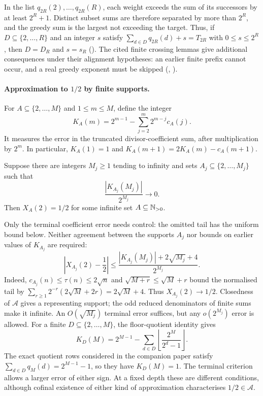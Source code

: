 \documentclass[11pt]{article}
\newcommand{\Ach}{\mathcal A}
\begin{document}
\noindent In the list $q_{2R}(2),\ldots,q_{2R}(R)$, each weight exceeds
the sum of its successors by at least $2^R+1$. Distinct subset sums
are therefore separated by more than $2^R$, and the greedy sum is the
largest not exceeding the target. Thus, if
$D\subseteq\{2,\ldots,R\}$ and an integer $s$ satisfy
$\sum_{d\in D}q_{2R}(d)+s=T_{2R}$ with $0\le s\le2^R$, then
$D=D_R$ and $s=s_R$
().
The cited finite crossing lemmas give additional consequences under their
alignment hypotheses: an earlier finite prefix cannot occur, and a real
greedy exponent must be skipped
(,
).

\paragraph{Approximation to $1/2$ by finite supports.}
For $A\subseteq\{2,\ldots,M\}$ and $1\le m\le M$, define the integer
\[
 K_A(m)=2^{m-1}-\sum_{j=2}^{m}2^{m-j}c_A(j).
\]
It measures the error in the truncated divisor-coefficient sum, after
multiplication by $2^m$.  In particular,
$K_A(1)=1$ and $K_A(m+1)=2K_A(m)-c_A(m+1)$.

\begin{theorem}
\label{res:terminalhalf}
Suppose there are integers $M_j\ge1$ tending to infinity and sets
$A_j\subseteq\{2,\ldots,M_j\}$ such that
\[
 \frac{|K_{A_j}(M_j)|}{2^{M_j}}\longrightarrow0.
\]
Then $X_A(2)=1/2$ for some infinite set $A\subseteq\mathbb{N}_{>0}$.
\end{theorem}

Only the terminal coefficient error needs control: the omitted tail
has the uniform bound below. Neither agreement between the supports
$A_j$ nor bounds on earlier values of $K_{A_j}$ are required:
\[
 \left|X_{A_j}(2)-\frac12\right|
 \le \frac{|K_{A_j}(M_j)|+2\sqrt{M_j}+4}{2^{M_j}}.
\]
Indeed, $c_{A_j}(n)\le\tau(n)\le2\sqrt n$ and
$\sqrt{M+r}\le\sqrt M+r$ bound the normalised tail by
$\sum_{r\ge1}2^{-r}(2\sqrt M+2r)=2\sqrt M+4$.
Thus $X_{A_j}(2)\to1/2$. Closedness of $\Ach$ gives a representing
support; the odd reduced denominators of finite sums make it infinite.
An $O(\sqrt{M_j})$ terminal error suffices, but any $o(2^{M_j})$
error is allowed.  For a finite $D\subseteq\{2,\ldots,M\}$, the
floor-quotient identity gives
\[
 K_D(M)=2^{M-1}-\sum_{d\in D}
                \left\lfloor\frac{2^M}{2^d-1}\right\rfloor.
\]
The exact quotient rows considered in the companion paper satisfy
$\sum_{d\in D}q_M(d)=2^{M-1}-1$, so they have $K_D(M)=1$.
The terminal criterion allows a larger error of either sign. At a fixed depth these are
different conditions, although cofinal existence of either kind of
approximation characterises $1/2\in\Ach$.
\end{document}
